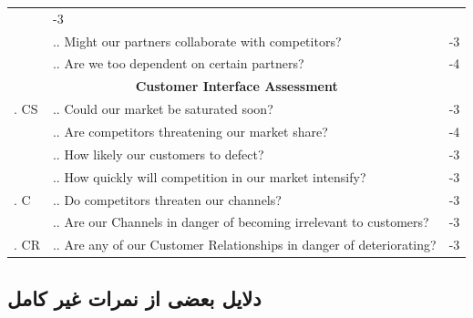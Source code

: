 \documentclass[dvipsnames, svgnames, x11names, 11pt]{article}
\newcounter{secq}
\newcommand{\seccnt}{\stepcounter{secq}\arabic{secq}. }
\newcounter{swotq}[secq]
\newcommand{\swotqcnt}{\stepcounter{swotq}\arabic{secq}.\arabic{swotq}. }
\begin{document}
\begin{latin}
\begin{center}
\begin{longtable}{p{}|p{}|p{}}
& -3 \\ \cline{2-3}
& \swotqcnt Might our partners collaborate with competitors?
& -3 \\ \cline{2-3}
& \swotqcnt Are we too dependent on certain partners?
& -4 \\ 
\hline
\hline
\multicolumn{3}{c}{\textbf{Customer Interface Assessment}} \\
\hline
\hline
\multirow{1}{*}{\seccnt CS}
& \swotqcnt Could our market be saturated soon?
& -3 \\ \cline{2-3}
& \swotqcnt Are competitors threatening our market share?
& -4 \\ \cline{2-3}
& \swotqcnt How likely our customers to defect?
& -3 \\ \cline{2-3}
& \swotqcnt How quickly will competition in our market intensify?
& -3 \\
\hline
\multirow{1}{*}{\seccnt C}
& \swotqcnt Do competitors threaten our channels?
& -3 \\ \cline{2-3}
& \swotqcnt Are our Channels in danger of becoming irrelevant to customers?
& -3 \\
\hline
\seccnt CR
& \swotqcnt Are any of our Customer Relationships in danger of deteriorating?
& -3 \\ \hline
\end{longtable}
\end{center}
\end{latin}

\subsection{دلایل بعضی از نمرات غیر کامل}
\end{document}
